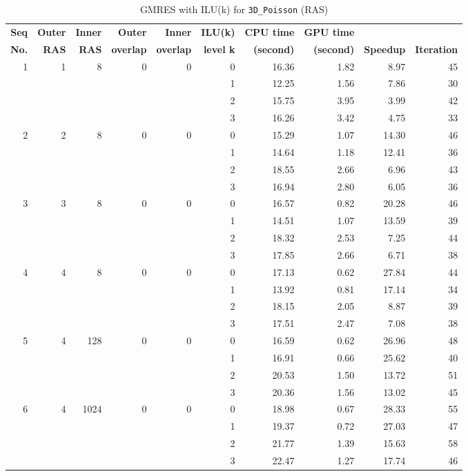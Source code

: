 \documentclass[runningheads,a4paper]{llncs}
\begin{document}
{\begin{table}[!htb]
\centering
\caption{GMRES with ILU(k) for \texttt{3D\_Poisson} (RAS)}
\begin{tabular}{|r|r|r|r|r|r|r|r|r|r|} \hline
\bfseries Seq & \bfseries Outer & \bfseries Inner & \bfseries Outer & \bfseries Inner & \bfseries ILU(k) & \bfseries CPU time  & \bfseries GPU time  & \bfseries        & \bfseries  \\
\bfseries No. & \bfseries RAS & \bfseries RAS & \bfseries overlap & \bfseries overlap & \bfseries level k & \bfseries (second)	& \bfseries (second)  & \bfseries Speedup  & \bfseries Iteration\\ \hline
1	&1	&8	&0	&0	&0	&16.36	&1.82	&8.97	&45\\
	&	&	&	&	&1	&12.25	&1.56	&7.86	&30\\
	&	&	&	&	&2	&15.75	&3.95	&3.99	&42\\
	&	&	&	&	&3	&16.26	&3.42	&4.75	&33\\
\hline
2	&2	&8	&0	&0	&0	&15.29	&1.07	&14.30	&46\\
	&	&	&	&	&1	&14.64	&1.18	&12.41	&36\\
	&	&	&	&	&2	&18.55	&2.66	&6.96	&43\\
	&	&	&	&	&3	&16.94	&2.80	&6.05	&36\\
\hline
3	&3	&8	&0	&0	&0	&16.57	&0.82	&20.28	&46\\
	&	&	&	&	&1	&14.51	&1.07	&13.59	&39\\
	&	&	&	&	&2	&18.32	&2.53	&7.25	&44\\
	&	&	&	&	&3	&17.85	&2.66	&6.71	&38\\
\hline
4	&4	&8	&0	&0	&0	&17.13	&0.62	&27.84	&44\\
	&	&	&	&	&1	&13.92	&0.81	&17.14	&34\\
	&	&	&	&	&2	&18.15	&2.05	&8.87	&39\\
	&	&	&	&	&3	&17.51	&2.47	&7.08	&38\\
\hline
5	&4	&128	&0	&0	&0	&16.59	&0.62	&26.96	&48\\
	&	&	&	&	&1	&16.91	&0.66	&25.62	&40\\
	&	&	&	&	&2	&20.53	&1.50	&13.72	&51\\
	&	&	&	&	&3	&20.36	&1.56	&13.02	&45\\
\hline
6	&4	&1024	&0	&0	&0	&18.98	&0.67	&28.33	&55\\
	&	&	&	&	&1	&19.37	&0.72	&27.03	&47\\
	&	&	&	&	&2	&21.77	&1.39	&15.63	&58\\
	&	&	&	&	&3	&22.47	&1.27	&17.74	&46\\
\hline
\end{tabular}
\label{table-gpus}
\end{table}

}
\end{document}

